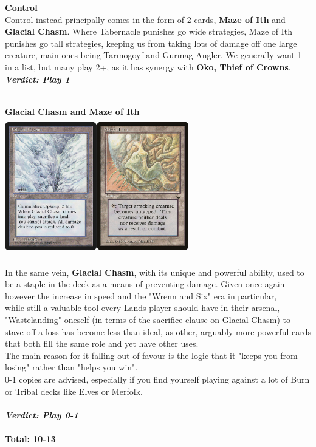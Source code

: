 \documentclass{report}
\begin{document}
\textbf{Control}\\
Control instead principally comes in the form of 2 cards, \textbf{Maze of Ith} and \textbf{Glacial Chasm}.
Where Tabernacle punishes go wide strategies, Maze of Ith punishes go tall strategies, keeping us from taking lots of damage off one large creature, main ones being Tarmogoyf and Gurmag Angler. We generally want 1 in a list, but many play 2+, as it has synergy with \textbf{Oko, Thief of Crowns}.
\\\textbf{\emph{Verdict: Play 1\\\\}}
\begin{center}
\textbf{Glacial Chasm and Maze of Ith\\}
\includegraphics [width = 8cm, height = 6cm] {chasm-maze}
\end{center}
In the same vein, \textbf{Glacial Chasm}, with its unique and powerful ability, used to be a staple in the deck as a means of preventing damage. Given once again however the increase in speed and the "Wrenn and Six" era in particular,\\ while still a valuable tool every Lands player should have in their arsenal,\\"Wastelanding" oneself (in terms of the sacrifice clause on Glacial Chasm) to stave off a loss has become less than ideal, as other, arguably more powerful cards that both fill the same role and yet have other uses.\\The main reason for it falling out of favour is the logic that it "keeps you from losing" rather than "helps you win".\\ 0-1 copies are advised, especially if you find yourself playing against a lot of Burn or Tribal decks like Elves or Merfolk.\\
\\\textbf{\emph{Verdict: Play 0-1\\\\}}
\textbf{Total: 10-13}
\end{document}
